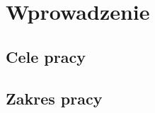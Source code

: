 \chapter{Wprowadzenie}
\label{cha:wprowadzenie}


\section{Cele pracy}
\label{sec:celePracy}


\section{Zakres pracy}
\label{sec:zakresPracy}



















